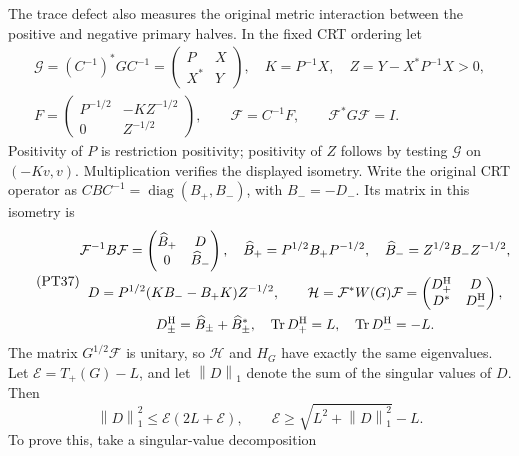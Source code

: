 \documentclass[11pt,a4paper]{article}
\providecommand{\diag}{\operatorname{diag}}
\providecommand{\Tr}{\operatorname{Tr}}
\providecommand{\norm}[1]{\left\lVert#1\right\rVert}
\begin{document}
The trace defect also measures the original metric interaction
between the positive and negative primary halves. In the fixed
CRT ordering let
\begin{equation}\tag{PT36}
 \begin{gathered}
 \mathcal G=(C^{-1})^*GC^{-1}
       =\begin{pmatrix}P&X\\X^*&Y\end{pmatrix},\quad
 K=P^{-1}X,\quad Z=Y-X^*P^{-1}X>0,\\
 F=\begin{pmatrix}P^{-1/2}&-KZ^{-1/2}\\0&Z^{-1/2}\end{pmatrix},
 \qquad\mathcal F=C^{-1}F,\qquad\mathcal F^*G\mathcal F=I.
 \end{gathered}
\end{equation}
Positivity of \(P\) is restriction positivity; positivity of
\(Z\) follows by testing \(\mathcal G\) on \((-Kv,v)\).
Multiplication verifies the displayed isometry. Write the original
CRT operator as \(CBC^{-1}=\diag(B_+,B_-)\), with
\(B_-=-D_-\). Its matrix in this isometry is
\begin{equation}\tag{PT37}
 \begin{gathered}
 \mathcal F^{-1}B\mathcal F
   =\begin{pmatrix}\widehat B_+&D\\0&\widehat B_-\end{pmatrix},
 \quad\widehat B_+=P^{1/2}B_+P^{-1/2},\quad
 \widehat B_-=Z^{1/2}B_-Z^{-1/2},\\
 D=P^{1/2}(KB_--B_+K)Z^{-1/2},\qquad
 \mathcal H=\mathcal F^*W(G)\mathcal F
   =\begin{pmatrix}D_+^{\rm H}&D\\D^*&D_-^{\rm H}\end{pmatrix},\\
 D_\pm^{\rm H}=\widehat B_\pm+\widehat B_\pm^*,\quad
 \Tr D_+^{\rm H}=L,\quad\Tr D_-^{\rm H}=-L.
 \end{gathered}
\end{equation}
The matrix \(G^{1/2}\mathcal F\) is unitary, so \(\mathcal H\)
and \(H_G\) have exactly the same eigenvalues. Let
\(\mathcal E=T_+(G)-L\), and let \(\norm D_1\) denote the
sum of the singular values of \(D\). Then
\begin{equation}\tag{PT38}
 \norm D_1^2\le\mathcal E(2L+\mathcal E),\qquad
 \mathcal E\ge\sqrt{L^2+\norm D_1^2}-L.
\end{equation}
To prove this, take a singular-value decomposition
\end{document}
